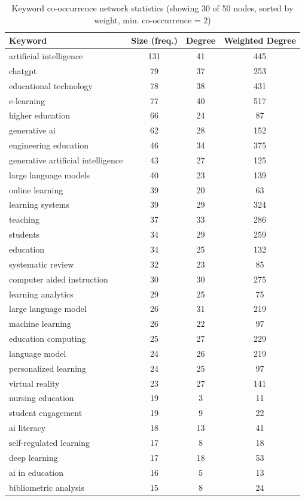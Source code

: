 \begin{table}[htbp]
\centering
\caption{Keyword co-occurrence network statistics (showing 30 of 50 nodes, sorted by weight, min. co-occurrence = 2)}
\label{tab:keyword_cooccurrence_network_node_stats}
\begin{tabular}{p{6cm}ccc}
\toprule
Keyword & Size (freq.) & Degree & Weighted Degree \\
\midrule
\rowcolor{white}
artificial intelligence & 131 & 41 & 445 \\
\rowcolor{gray!15}
chatgpt & 79 & 37 & 253 \\
\rowcolor{white}
educational technology & 78 & 38 & 431 \\
\rowcolor{gray!15}
e-learning & 77 & 40 & 517 \\
\rowcolor{white}
higher education & 66 & 24 & 87 \\
\rowcolor{gray!15}
generative ai & 62 & 28 & 152 \\
\rowcolor{white}
engineering education & 46 & 34 & 375 \\
\rowcolor{gray!15}
generative artificial intelligence & 43 & 27 & 125 \\
\rowcolor{white}
large language models & 40 & 23 & 139 \\
\rowcolor{gray!15}
online learning & 39 & 20 & 63 \\
\rowcolor{white}
learning systems & 39 & 29 & 324 \\
\rowcolor{gray!15}
teaching & 37 & 33 & 286 \\
\rowcolor{white}
students & 34 & 29 & 259 \\
\rowcolor{gray!15}
education & 34 & 25 & 132 \\
\rowcolor{white}
systematic review & 32 & 23 & 85 \\
\rowcolor{gray!15}
computer aided instruction & 30 & 30 & 275 \\
\rowcolor{white}
learning analytics & 29 & 25 & 75 \\
\rowcolor{gray!15}
large language model & 26 & 31 & 219 \\
\rowcolor{white}
machine learning & 26 & 22 & 97 \\
\rowcolor{gray!15}
education computing & 25 & 27 & 229 \\
\rowcolor{white}
language model & 24 & 26 & 219 \\
\rowcolor{gray!15}
personalized learning & 24 & 25 & 97 \\
\rowcolor{white}
virtual reality & 23 & 27 & 141 \\
\rowcolor{gray!15}
nursing education & 19 & 3 & 11 \\
\rowcolor{white}
student engagement & 19 & 9 & 22 \\
\rowcolor{gray!15}
ai literacy & 18 & 13 & 41 \\
\rowcolor{white}
self-regulated learning & 17 & 8 & 18 \\
\rowcolor{gray!15}
deep learning & 17 & 18 & 53 \\
\rowcolor{white}
ai in education & 16 & 5 & 13 \\
\rowcolor{gray!15}
bibliometric analysis & 15 & 8 & 24 \\
\bottomrule
\end{tabular}
\end{table}